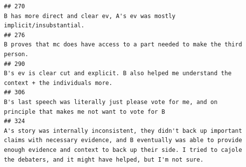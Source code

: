 \documentclass[
]{article}
\begin{document}
\begin{verbatim}
## 270                                                                                                                                                                                                                                                                                                                                                                                                                                                                                                                         B has more direct and clear ev, A's ev was mostly implicit/insubstantial. 
## 276                                                                                                                                                                                                                                                                                                                                                                                                                                                                                                                      B proves that mc does have access to a part needed to make the third person. 
## 290                                                                                                                                                                                                                                                                                                                                                                                                                                                                                                 B's ev is clear cut and explicit. B also helped me understand the context + the individuals more. 
## 306                                                                                                                                                                                                                                                                                                                                                                                                                                                                                       B's last speech was literally just please vote for me, and on principle that makes me not want to vote for B
## 324                                                                                                                                                                                                                                                                                                                           A's story was internally inconsistent, they didn't back up important claims with necessary evidence, and B eventually was able to provide enough evidence and context to back up their side. I tried to cajole the debaters, and it might have helped, but I'm not sure.

\end{verbatim}
\end{document}
